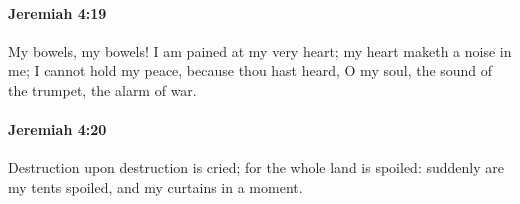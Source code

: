 		\paragraph{Jeremiah 4:19} %
			\label{JEREMIAH-4-19}

			My bowels, my bowels! I am pained at my very heart; my heart maketh a noise in me; I cannot hold my peace, because thou hast heard, O my soul, the sound of the trumpet, the alarm of war.


		\paragraph{Jeremiah 4:20} %
			\label{JEREMIAH-4-20}

			Destruction upon destruction is cried; for the whole land is spoiled: suddenly are my tents spoiled, and my curtains in a moment.


